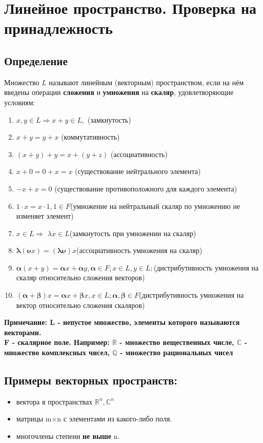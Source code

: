 \documentclass[12pt]{article}
\begin{document}
\section{Линейное пространство. Проверка на принадлежность}
\subsection{Определение}
Множество $L$ называют линейным (векторным) пространством, если на нём введены операции \textbf{ сложения} и {\bf умножения} на {\bf скаляр}, удовлетворяющие условиям:
\begin{enumerate}
    \item $x,y \in L \Rightarrow x + y \in L, $ (замкнутость)
    \item $x+y = y+x $ (коммутативность)
    \item $(x+y)+y=x+(y+z)$ (ассоциативность)
    \item $x+0=0+x=x$ (существование нейтрального элемента)
    \item $-x+x=0$ (существование противоположного для каждого элемента)
    \item $1 \cdot x=x \cdot 1, 1 \in F$(умножение на нейтральный скаляр по умножению не изменяет элемент)
    \item $x \in L \Rightarrow $ $\lambda x \in L$(замкнутость при умножении на скаляр)
    \item $\mathbf{\lambda} (\mathbf{\nu} x)=(\mathbf{\lambda \nu})x$(ассоциативность умножения на скаляр)
    \item $\mathbf{\alpha}(x+y)=\mathbf{\alpha}x+\mathbf{\alpha}y, \mathbf{\alpha}\in F; x \in L,y \in L;$(дистрибутивность умножения на скаляр относительно сложения векторов)
    \item $(\mathbf{\alpha}+\mathbf{\beta})x=\mathbf{\alpha}x+\mathbf{\beta}x, x \in L; \mathbf{\alpha} , \mathbf{\beta} \in F$(дистрибутивность умножения на вектор относительно сложения скаляров)

\end{enumerate}
\textbf{Примечание: L - непустое множество, элементы которого называются векторами.}\\
\textbf{F - скалярное поле. Например: $\mathbb{R}$ - множество вещественных числе, $\mathbb{C}$ - множество комплексных чисел, $\mathbb{Q}$ - множество рациональных чисел}
\subsection{Примеры векторных пространств:}
\begin{itemize}
    \item вектора в пространствах $\mathbb{R}^n, \mathbb{C}^n$
    \item матрицы m$\times$n с элементами из какого-либо поля.
    \item многочлены степени {\bf не выше} n.
\end{itemize}
\end{document}
